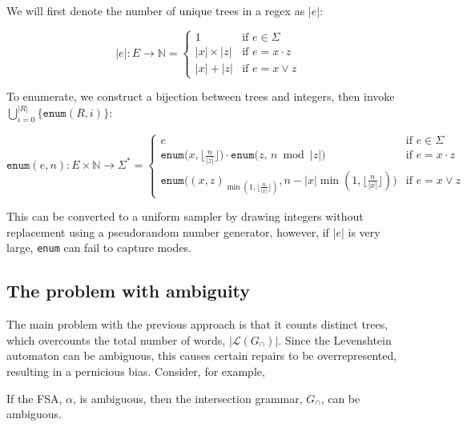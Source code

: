 \documentclass[sigplan,acmsmall,nonacm,screen]{acmart}\settopmatter{printfolios=false,printccs=false,printacmref=false}
\begin{document}
\begin{theorem}[Enumeration]
  We will first denote the number of unique trees in a regex as $|e|$:

  \begin{equation}
    |e|: E \rightarrow \mathbb{N} = \begin{cases}
        1           & \text{if } e \in \Sigma \\
        |x| \times |z|  & \text{if } e = x \cdot z \\
        |x| + |z|       & \text{if } e = x \vee z
    \end{cases}
  \end{equation}

  To enumerate, we construct a bijection between trees and integers, then invoke $\bigcup_{i = 0}^{|R|}\{\texttt{enum}(R, i)\}$:

  \begin{equation}
    \texttt{enum}(e, n): E \times \mathbb{N} \rightarrow \Sigma^* = \begin{cases}
         e &\text{if } e \in \Sigma \\
         \texttt{enum}\big(x, \lfloor \frac{n}{|z|} \rfloor\big) \cdot \texttt{enum}\big(z,\, n \bmod |z|\big)  &\text{if } e = x \cdot z \\
         \texttt{enum}\big((x, z)_{\min(1, \lfloor\frac{n}{|x|}\rfloor)}, n-|x|\min(1, \lfloor\frac{n}{|x|}\rfloor)\big) &\text{if } e = x \vee z
    \end{cases}
  \end{equation}
\end{theorem}

This can be converted to a uniform sampler by drawing integers without replacement using a pseudorandom number generator, however, if $|e|$ is very large, \texttt{enum} can fail to capture modes.

\subsection{The problem with ambiguity}

The main problem with the previous approach is that it counts distinct trees, which overcounts the total number of words, $|\mathcal{L}(G_\cap)|$. Since the Levenshtein automaton can be ambiguous, this causes certain repairs to be overrepresented, resulting in a pernicious bias. Consider, for example,

\begin{lemma}\label{lemma:ambiguity}
If the FSA, $\alpha$, is ambiguous, then the intersection grammar, $G_\cap$, can be ambiguous.
\end{lemma}
\end{document}
